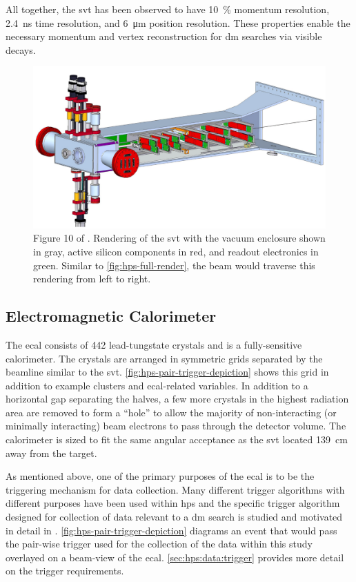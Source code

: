 All together, the \ac{svt} has been observed to have \num{10}~\% momentum resolution,
\qty{2.4}{\ns} time resolution, and \qty{6}{\micro\meter} position resolution. These properties
enable the necessary momentum and vertex reconstruction for \ac{dm} searches via visible decays.

\begin{figure}
  \centering
  \includegraphics*[width=\textwidth]{figures/hps/experiment/skmccarty-thesis-fig-10-svt-render.png}
  \caption{
    Figure 10 of \cite{skmccarty-thesis-2020}. Rendering of the \ac{svt} with the vacuum
    enclosure shown in gray, active silicon components in red, and readout electronics in
    green. Similar to \cref{fig:hps-full-render}, the beam would traverse this rendering
    from left to right.
  }
  \label{fig:hps-svt-render}
\end{figure}

\subsection{Electromagnetic Calorimeter}
\label{sec:hps-ecal}
The \ac{ecal} consists of \num{442} lead-tungstate crystals and is a fully-sensitive calorimeter.
The crystals are arranged in symmetric grids separated by the beamline similar to the \ac{svt}.
\cref{fig:hps-pair-trigger-depiction} shows this grid in addition to example clusters and \ac{ecal}-related
variables. In addition to a horizontal gap separating the halves, a few more crystals in the highest
radiation area are removed to form a ``hole'' to allow the majority of non-interacting (or minimally interacting)
beam electrons to pass through the detector volume. The calorimeter is sized to fit the same
angular acceptance as the \ac{svt} located \qty{139}{\cm} away from the target.

As mentioned above, one of the primary purposes of the \ac{ecal} is to be the triggering mechanism
for data collection. Many different trigger algorithms with different purposes have been used
within \ac{hps} and the specific trigger algorithm designed for collection of data relevant to a
\ac{dm} search is studied and motivated in detail in \cite{skmccarty-thesis-2020}.
\cref{fig:hps-pair-trigger-depiction} diagrams an event that would pass the pair-wise trigger used
for the collection of the data within this study overlayed on a beam-view of the \ac{ecal}.
\cref{sec:hps:data:trigger} provides more detail on the trigger requirements.

